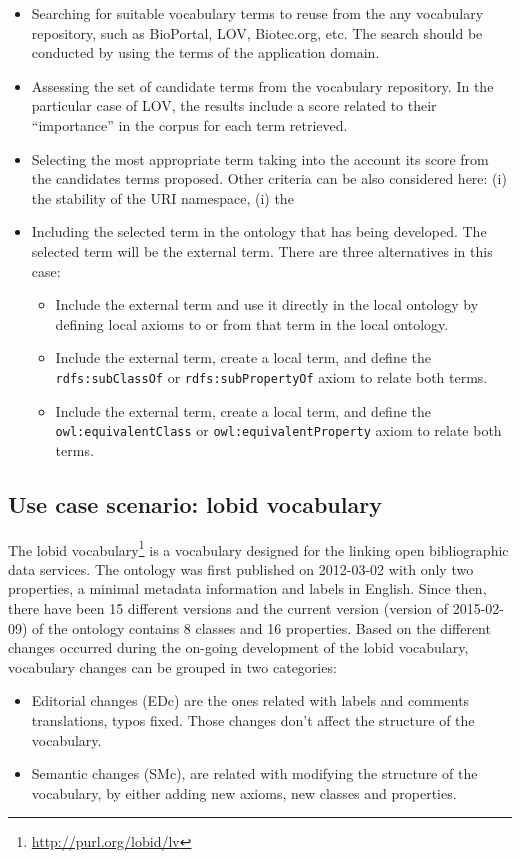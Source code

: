 \begin{itemize}
	\item Searching for suitable vocabulary terms to reuse from the any vocabulary repository, such as BioPortal, LOV, Biotec.org, etc. The search should be conducted by using the terms of the application domain.
	\item Assessing the set of candidate terms from the vocabulary repository. In the particular case of LOV, the results include a score related to their ``importance'' in the corpus for each term retrieved.
	\item Selecting the most appropriate term taking into the account its score from the candidates terms proposed. Other criteria can be also considered here: (i) the stability of the URI namespace, (i) the 
	\item Including the selected term in the ontology that has being developed. The selected term will be the external term. There are three alternatives in this case: 
	\begin{itemize}
		\item Include the external term and use it directly in the local ontology by defining local axioms to or from that term in the local ontology.
		\item Include the external term, create a local term, and define the {\tt rdfs:subClassOf} or {\tt rdfs:subPropertyOf} axiom to relate both terms.
		\item Include the external term, create a local term, and define the {\tt owl:equivalentClass} or {\tt owl:equivalentProperty} axiom to relate both terms. 				
	\end{itemize}
\end{itemize}

\subsection{Use case scenario: lobid vocabulary}
\label{lobid vocabulary}
The lobid vocabulary\footnote{\url{http://purl.org/lobid/lv}} is a vocabulary designed for the  linking open bibliographic data services. The ontology was first published on 2012-03-02 with only two properties, a minimal metadata information and labels in English. Since then, there have been 15 different versions and the current version (version of 2015-02-09) of the ontology contains 8 classes and 16 properties. Based on the different changes occurred during the on-going development of the lobid vocabulary, vocabulary changes can be grouped in two categories:
\begin{itemize}
\item Editorial changes (EDc) are the ones related with labels and comments translations, typos fixed. Those changes don't affect the structure of the vocabulary.
\item Semantic changes (SMc), are related with modifying the structure of the vocabulary, by either adding new axioms, new classes and properties.
\end{itemize}

